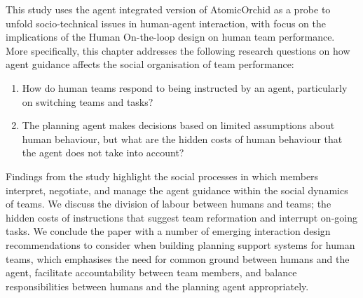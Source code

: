 This study uses the agent integrated version of AtomicOrchid as a probe to unfold socio-technical issues in human-agent interaction, with focus on the implications of the Human On-the-loop design on human team performance. More specifically, this chapter addresses the following research questions on how agent guidance affects the social organisation of team performance:\\

\begin{enumerate}
\item How do human teams respond to being instructed by an agent, particularly on switching teams and tasks?\\
\item The planning agent makes decisions based on limited assumptions about human behaviour, but what are the hidden costs of human behaviour that the agent does not take into account?\\
\end{enumerate}

Findings from the study highlight the social processes in which members interpret, negotiate, and manage the agent guidance within the social dynamics of teams. We discuss the division of labour between humans and teams; the hidden costs of instructions that suggest team reformation and interrupt on-going tasks. We conclude the paper with a number of emerging interaction design recommendations to consider when building planning support systems for human teams, which emphasises the need for common ground between humans and the agent, facilitate accountability between team members, and balance responsibilities between humans and the planning agent appropriately.\\



